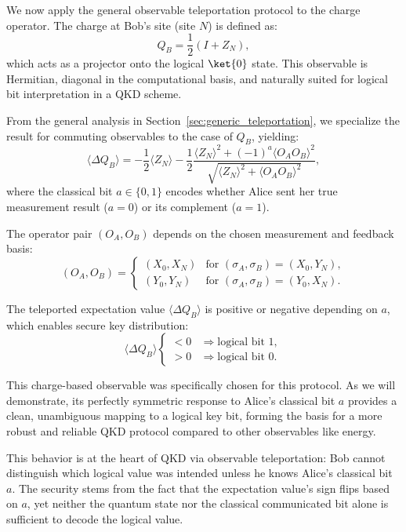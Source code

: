 We now apply the general observable teleportation protocol to the charge operator. The charge at Bob’s site (site $N$) is defined as:
\begin{equation}
Q_B = \frac{1}{2}(I + Z_N),
\end{equation}
which acts as a projector onto the logical \( \ket{0} \) state. This observable is Hermitian, diagonal in the computational basis, and naturally suited for logical bit interpretation in a QKD scheme.

From the general analysis in Section~\ref{sec:generic_teleportation}, we specialize the result for commuting observables to the case of $Q_B$, yielding:
\begin{equation}
\langle \Delta Q_B \rangle = -\frac{1}{2} \langle Z_N \rangle - \frac{1}{2} \frac{\langle Z_N \rangle^2 + (-1)^a \langle O_A O_B \rangle^2}{\sqrt{\langle Z_N \rangle^2 + \langle O_A O_B \rangle^2}},
\end{equation}
where the classical bit \(a \in \{0,1\}\) encodes whether Alice sent her true measurement result (\(a=0\)) or its complement (\(a=1\)).

The operator pair \((O_A, O_B)\) depends on the chosen measurement and feedback basis:
\begin{equation}
(O_A, O_B) =
\begin{cases}
(X_0, X_N) & \text{for } (\sigma_A, \sigma_B) = (X_0, Y_N), \\
(Y_0, Y_N) & \text{for } (\sigma_A, \sigma_B) = (Y_0, X_N).
\end{cases}
\end{equation}

The teleported expectation value $\langle \Delta Q_B \rangle$ is positive or negative depending on $a$, which enables secure key distribution:
\begin{equation}
\langle \Delta Q_B \rangle
\begin{cases}
< 0 & \Rightarrow \text{logical bit } 1, \\
> 0 & \Rightarrow \text{logical bit } 0.
\end{cases}
\end{equation}

This charge-based observable was specifically chosen for this protocol. As we will demonstrate, its perfectly symmetric response to Alice's classical bit $a$ provides a clean, unambiguous mapping to a logical key bit, forming the basis for a more robust and reliable QKD protocol compared to other observables like energy.

This behavior is at the heart of QKD via observable teleportation: Bob cannot distinguish which logical value was intended unless he knows Alice's classical bit $a$. The security stems from the fact that the expectation value's sign flips based on $a$, yet neither the quantum state nor the classical communicated bit alone is sufficient to decode the logical value.
